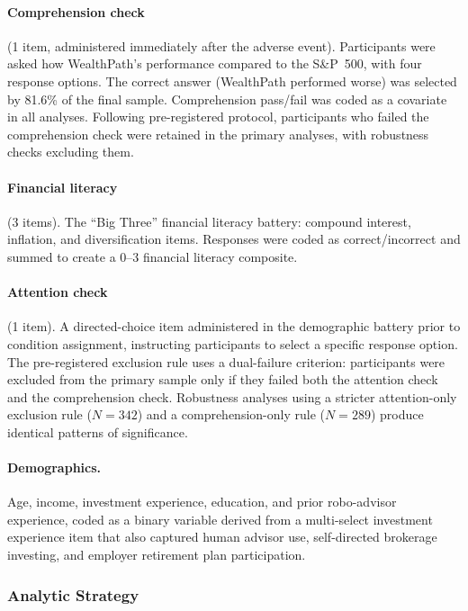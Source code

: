 \paragraph{Comprehension check} (1 item, administered immediately after the adverse event). Participants were asked how WealthPath's performance compared to the S\&P~500, with four response options. The correct answer (WealthPath performed worse) was selected by 81.6\% of the final sample. Comprehension pass/fail was coded as a covariate in all analyses. Following pre-registered protocol, participants who failed the comprehension check were retained in the primary analyses, with robustness checks excluding them.

\paragraph{Financial literacy} (3 items). The \citet{LusardiMitchell2014} ``Big Three'' financial literacy battery: compound interest, inflation, and diversification items. Responses were coded as correct/incorrect and summed to create a 0--3 financial literacy composite.

\paragraph{Attention check} (1 item). A directed-choice item administered in the demographic battery prior to condition assignment, instructing participants to select a specific response option. The pre-registered exclusion rule uses a dual-failure criterion: participants were excluded from the primary sample only if they failed both the attention check and the comprehension check. Robustness analyses using a stricter attention-only exclusion rule ($N = 342$) and a comprehension-only rule ($N = 289$) produce identical patterns of significance.

\paragraph{Demographics.} Age, income, investment experience, education, and prior robo-advisor experience, coded as a binary variable derived from a multi-select investment experience item that also captured human advisor use, self-directed brokerage investing, and employer retirement plan participation.

\subsubsection{Analytic Strategy}
\label{sec:methods_analysis}

